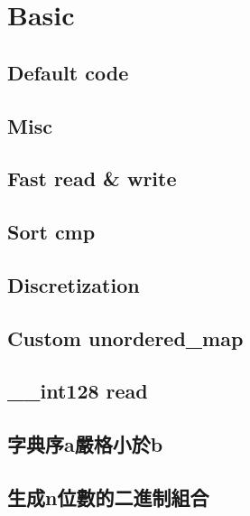 
\section{Basic}

\subsection{Default code}


\subsection{Misc}


\subsection{Fast read \& write}


\subsection{Sort cmp}


\subsection{Discretization}


\subsection{Custom unordered\_map}


\subsection{\_\_int128 read}


\subsection{字典序a嚴格小於b}


\subsection{生成n位數的二進制組合}


